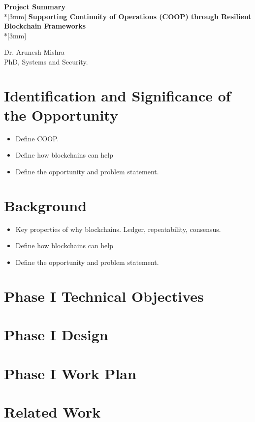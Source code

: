 \documentclass{proposal}
\begin{document}
\begin{center}
{{\bf Project Summary}}\\*[3mm]
{\Large \bf Supporting Continuity of Operations (COOP) through Resilient Blockchain Frameworks } \\*[3mm]

Dr. Arunesh Mishra\\
PhD, Systems and Security.

\end{center}
\section{Identification and Significance of the Opportunity}

\begin{itemize}
\item Define COOP.
\item Define how blockchains can help
\item Define the opportunity and problem statement.
\end{itemize}

\cite{sample_ref}

\section{Background}

\begin{itemize}
\item Key properties of why blockchains. Ledger, repeatability, consensus.
\item Define how blockchains can help
\item Define the opportunity and problem statement.
\end{itemize}

\section{Phase I Technical Objectives}
\section{Phase I Design}
\section{Phase I Work Plan}
\section{Related Work}
\end{document}
